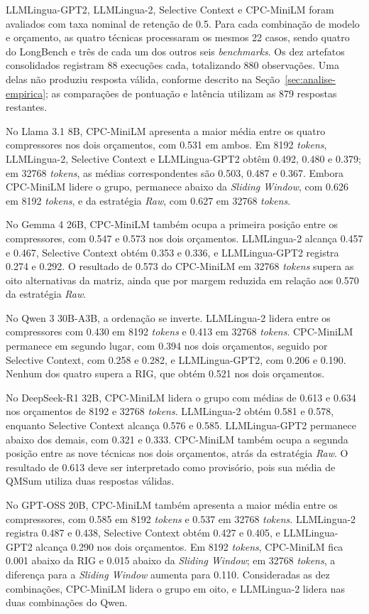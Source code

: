 LLMLingua-GPT2, LLMLingua-2, Selective Context e CPC-MiniLM foram avaliados com taxa nominal de retenção de 0.5. Para cada combinação de modelo e orçamento, as quatro técnicas processaram os mesmos 22 casos, sendo quatro do LongBench e três de cada um dos outros seis \textit{benchmarks}. Os dez artefatos consolidados registram 88 execuções cada, totalizando 880 observações. Uma delas não produziu resposta válida, conforme descrito na Seção~\ref{sec:analise-empirica}; as comparações de pontuação e latência utilizam as 879 respostas restantes.

No Llama 3.1 8B, CPC-MiniLM apresenta a maior média entre os quatro compressores nos dois orçamentos, com 0.531 em ambos. Em 8192 \textit{tokens}, LLMLingua-2, Selective Context e LLMLingua-GPT2 obtêm 0.492, 0.480 e 0.379; em 32768 \textit{tokens}, as médias correspondentes são 0.503, 0.487 e 0.367. Embora CPC-MiniLM lidere o grupo, permanece abaixo da \textit{Sliding Window}, com 0.626 em 8192 \textit{tokens}, e da estratégia \textit{Raw}, com 0.627 em 32768 \textit{tokens}.

No Gemma 4 26B, CPC-MiniLM também ocupa a primeira posição entre os compressores, com 0.547 e 0.573 nos dois orçamentos. LLMLingua-2 alcança 0.457 e 0.467, Selective Context obtém 0.353 e 0.336, e LLMLingua-GPT2 registra 0.274 e 0.292. O resultado de 0.573 do CPC-MiniLM em 32768 \textit{tokens} supera as oito alternativas da matriz, ainda que por margem reduzida em relação aos 0.570 da estratégia \textit{Raw}.

No Qwen 3 30B-A3B, a ordenação se inverte. LLMLingua-2 lidera entre os compressores com 0.430 em 8192 \textit{tokens} e 0.413 em 32768 \textit{tokens}. CPC-MiniLM permanece em segundo lugar, com 0.394 nos dois orçamentos, seguido por Selective Context, com 0.258 e 0.282, e LLMLingua-GPT2, com 0.206 e 0.190. Nenhum dos quatro supera a RIG, que obtém 0.521 nos dois orçamentos.

No DeepSeek-R1 32B, CPC-MiniLM lidera o grupo com médias de 0.613 e 0.634 nos orçamentos de 8192 e 32768 \textit{tokens}. LLMLingua-2 obtém 0.581 e 0.578, enquanto Selective Context alcança 0.576 e 0.585. LLMLingua-GPT2 permanece abaixo dos demais, com 0.321 e 0.333. CPC-MiniLM também ocupa a segunda posição entre as nove técnicas nos dois orçamentos, atrás da estratégia \textit{Raw}. O resultado de 0.613 deve ser interpretado como provisório, pois sua média de QMSum utiliza duas respostas válidas.

No GPT-OSS 20B, CPC-MiniLM também apresenta a maior média entre os compressores, com 0.585 em 8192 \textit{tokens} e 0.537 em 32768 \textit{tokens}. LLMLingua-2 registra 0.487 e 0.438, Selective Context obtém 0.427 e 0.405, e LLMLingua-GPT2 alcança 0.290 nos dois orçamentos. Em 8192 \textit{tokens}, CPC-MiniLM fica 0.001 abaixo da RIG e 0.015 abaixo da \textit{Sliding Window}; em 32768 \textit{tokens}, a diferença para a \textit{Sliding Window} aumenta para 0.110. Consideradas as dez combinações, CPC-MiniLM lidera o grupo em oito, e LLMLingua-2 lidera nas duas combinações do Qwen.

